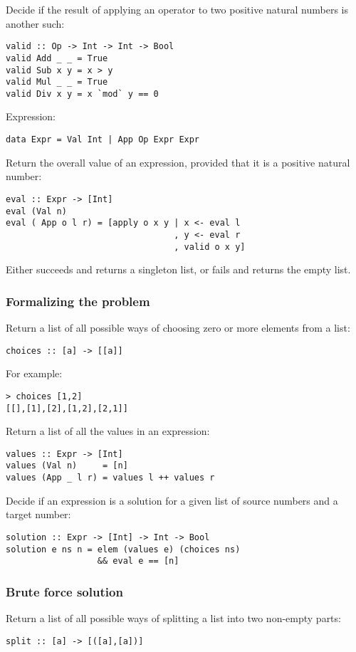 \begin{multicols}{2}
Decide if the result of applying an operator to two positive natural numbers is another such:
\begin{lstlisting}
valid :: Op -> Int -> Int -> Bool
valid Add _ _ = True
valid Sub x y = x > y
valid Mul _ _ = True
valid Div x y = x `mod` y == 0
\end{lstlisting}

Expression:
\begin{lstlisting}
data Expr = Val Int | App Op Expr Expr
\end{lstlisting}

Return the overall value of an expression, provided that it is a positive natural number:
\begin{lstlisting}
eval :: Expr -> [Int]
eval (Val n)
eval ( App o l r) = [apply o x y | x <- eval l
                                 , y <- eval r
                                 , valid o x y]
\end{lstlisting}
Either succeeds and returns a singleton list, or fails and returns the empty list.

\subsubsection{Formalizing the problem}
Return a list of all possible ways of choosing zero or more elements from a list:
\begin{lstlisting}
choices :: [a] -> [[a]]
\end{lstlisting}

For example:
\begin{lstlisting}
> choices [1,2]
[[],[1],[2],[1,2],[2,1]]
\end{lstlisting}

Return a list of all the values in an expression:
\begin{lstlisting}
values :: Expr -> [Int]
values (Val n)     = [n]
values (App _ l r) = values l ++ values r
\end{lstlisting}

Decide if an expression is a solution for a given list of source numbers and a target number:
\begin{lstlisting}
solution :: Expr -> [Int] -> Int -> Bool
solution e ns n = elem (values e) (choices ns)
                  && eval e == [n]
\end{lstlisting}

\subsubsection{Brute force solution}
Return a list of all possible ways of splitting a list into two non-empty parts:
\begin{lstlisting}
split :: [a] -> [([a],[a])]
\end{lstlisting}


\end{multicols}
